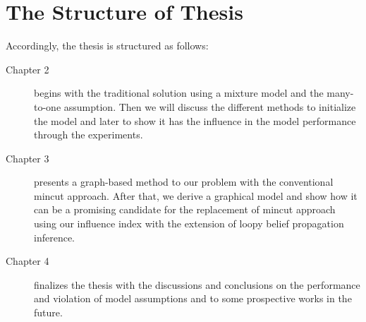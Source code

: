 \section{The Structure of Thesis}
Accordingly, the thesis is structured as follows:
\begin{description}
	\item[Chapter 2] begins with the traditional solution using a mixture model and the many-to-one assumption. Then we will discuss the different methods to initialize the model and later to show it has the influence in the model performance through the experiments.
	
	\item[Chapter 3] presents a graph-based method to our problem with the conventional mincut approach. After that, we derive a graphical model and show how it can be a promising candidate for the replacement of mincut approach using our influence index with the extension of loopy belief propagation inference.
	
	\item[Chapter 4] finalizes the thesis with the discussions and conclusions on the performance and violation of model assumptions and to some prospective works in the future.
\end{description}